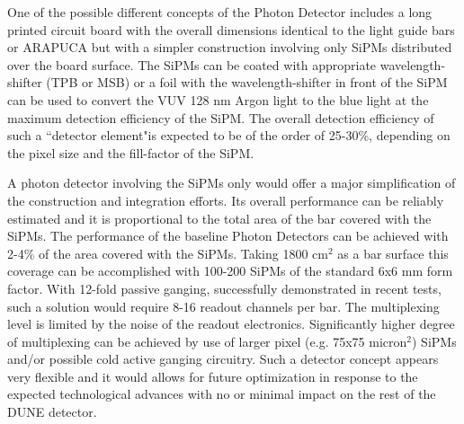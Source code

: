 One of the possible different concepts of the Photon Detector includes a long printed circuit board with the overall dimensions identical to the light guide bars or ARAPUCA but with a simpler construction involving only SiPMs distributed over the board surface. The SiPMs can be coated with  appropriate wavelength-shifter (TPB or MSB) or a foil with the wavelength-shifter in front of the SiPM can be used to convert the VUV 128 nm Argon light to the blue light at the maximum detection efficiency of the SiPM. The overall detection efficiency of such a ``detector element"is expected to be of the order of 25-30\%, depending on the pixel size and the fill-factor of the SiPM.

A photon detector involving the SiPMs only would offer a major simplification of the construction and integration efforts. Its overall performance can be reliably estimated and it is proportional to the total area of the bar covered with the SiPMs.
The performance of the baseline Photon Detectors can be achieved with 2-4\% of the area covered with the SiPMs. Taking 1800 cm$^2$ as a bar surface this coverage can be accomplished with 100-200 SiPMs of the standard 6x6 mm form factor. With 12-fold passive ganging, successfully demonstrated in recent tests, such a solution would require 8-16 readout channels per bar. The multiplexing level is limited by the noise of the readout electronics. Significantly higher degree of multiplexing can be achieved by use of larger pixel (e.g. 75x75 micron$^2$) SiPMs and/or possible cold active ganging circuitry. 
Such a detector concept appears very flexible and it would allows for future optimization in response to the expected technological advances with no or minimal impact on the rest of the DUNE  detector. 



